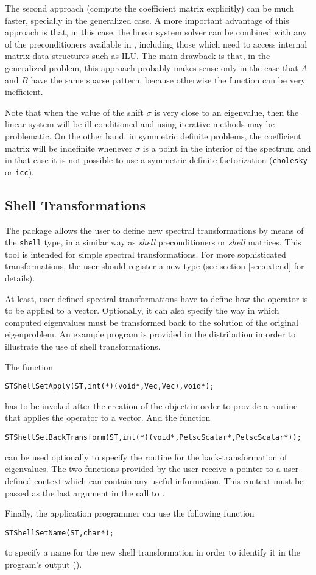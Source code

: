 	The second approach (compute the coefficient matrix explicitly) can be much faster, specially in the generalized case. A more important advantage of this approach is that, in this case, the linear system solver can be combined with any of the preconditioners available in \petsc, including those which need to access internal matrix data-structures such as ILU. The main drawback is that, in the generalized problem, this approach probably makes sense only in the case that $A$ and $B$ have the same sparse pattern, because otherwise the function  can be very inefficient.
	
	Note that when the value of the shift $\sigma$ is very close to an eigenvalue, then the linear system will be ill-conditioned and using iterative methods may be problematic. On the other hand, in symmetric definite problems, the coefficient matrix will be indefinite whenever $\sigma$ is a point in the interior of the spectrum and in that case it is not possible to use a symmetric definite factorization (\texttt{cholesky} or \texttt{icc}).

\subsection{Shell Transformations}
\label{sec:shell}

	The  package allows the user to define new spectral transformations by means of the \texttt{shell} type, in a similar way as \emph{shell} preconditioners or \emph{shell} matrices. This tool is intended for simple spectral transformations. For more sophisticated transformations, the user should register a new  type (see section \ref{sec:extend} for details).

	At least, user-defined spectral transformations have to define how the operator is to be applied to a vector. Optionally, it can also specify the way in which computed eigenvalues must be transformed back to the solution of the original eigenproblem. An example program is provided in the \slepc distribution in order to illustrate the use of shell transformations.

	The function
	\begin{Verbatim}[fontsize=\small]
      STShellSetApply(ST,int(*)(void*,Vec,Vec),void*);
	\end{Verbatim}
has to be invoked after the creation of the  object in order to provide a routine that applies the operator to a vector. And the function
	\begin{Verbatim}[fontsize=\small]
      STShellSetBackTransform(ST,int(*)(void*,PetscScalar*,PetscScalar*));
	\end{Verbatim}
can be used optionally to specify the routine for the back-transformation of eigenvalues. The two functions provided by the user receive a pointer to a user-defined context which can contain any useful information. This context must be passed as the last argument in the call to .

	Finally, the application programmer can use the following function
	\begin{Verbatim}[fontsize=\small]
      STShellSetName(ST,char*);
	\end{Verbatim}
to specify a name for the new shell transformation in order to identify it in the program's output ().


